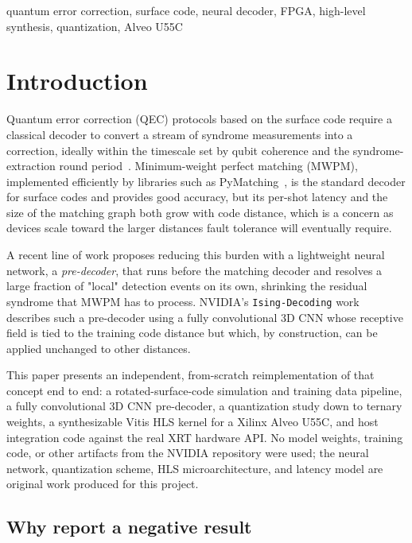 \documentclass[conference]{IEEEtran}
\begin{document}
\begin{IEEEkeywords}
quantum error correction, surface code, neural decoder, FPGA, high-level synthesis, quantization, Alveo U55C
\end{IEEEkeywords}

\section{Introduction}
\label{sec:introduction}

Quantum error correction (QEC) protocols based on the surface code require a classical decoder to convert a stream of syndrome measurements into a correction, ideally within the timescale set by qubit coherence and the syndrome-extraction round period~\cite{fowler2012surface}. Minimum-weight perfect matching (MWPM), implemented efficiently by libraries such as PyMatching~\cite{higgott2022pymatching}, is the standard decoder for surface codes and provides good accuracy, but its per-shot latency and the size of the matching graph both grow with code distance, which is a concern as devices scale toward the larger distances fault tolerance will eventually require.

A recent line of work proposes reducing this burden with a lightweight neural network, a \emph{pre-decoder}, that runs before the matching decoder and resolves a large fraction of "local" detection events on its own, shrinking the residual syndrome that MWPM has to process. NVIDIA's \texttt{Ising-Decoding} work~\cite{chamberland2026fast} describes such a pre-decoder using a fully convolutional 3D CNN whose receptive field is tied to the training code distance but which, by construction, can be applied unchanged to other distances.

This paper presents an independent, from-scratch reimplementation of that concept end to end: a rotated-surface-code simulation and training data pipeline, a fully convolutional 3D CNN pre-decoder, a quantization study down to ternary weights, a synthesizable Vitis HLS kernel for a Xilinx Alveo U55C, and host integration code against the real XRT hardware API. No model weights, training code, or other artifacts from the NVIDIA repository were used; the neural network, quantization scheme, HLS microarchitecture, and latency model are original work produced for this project.

\subsection{Why report a negative result}
\label{subsec:why-negative}
\end{document}

